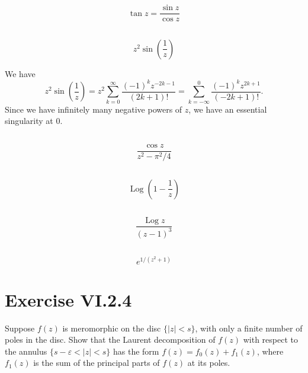 \documentclass[12pt]{article}
\newenvironment{problem}
    {\begin{lrbox}{\mybox}\begin{minipage}{0.98\textwidth}}
    {\end{minipage}\end{lrbox}\begin{center}\framebox[\textwidth]{\usebox{\mybox}}\end{center}}
\theoremstyle{definition}
\newcommand{\eps}{\varepsilon}
\newcommand{\Log}{\operatorname{Log}}
\begin{document}
\subsection{}
\begin{problem}
    \[
        \tan z = \frac{\sin z}{\cos z}
    \]
\end{problem}

\subsection{}
\begin{problem}
    \[
        z^2 \sin(\frac1z)
    \]
\end{problem}

We have
\[
    z^2 \sin(\frac1z)
        = z^2 \sum_{k=0}^\infty \frac{(-1)^k  z^{-2k - 1}}{(2k +1)!}
        = \sum_{k=-\infty}^0 \frac{(-1)^k  z^{2k + 1}}{(-2k +1)!}.
\]
Since we have infinitely many negative powers of $z$, we have an essential singularity at $0$.

\subsection{}
\begin{problem}
    \[
        \frac{\cos z}{z^2 - \pi^2/4}
    \]
\end{problem}

\subsection{}
\begin{problem}
    \[
        \Log\left(1 - \frac1z\right)
    \]
\end{problem}

\subsection{}
\begin{problem}
    \[
        \frac{\Log z}{(z - 1)^3}
    \]
\end{problem}

\subsection{}
\begin{problem}
    \[
        e^{1/(z^2 + 1)}
    \]
\end{problem}

\newpage
\section{Exercise VI.2.4}
\begin{problem}
    Suppose $f(z)$ is meromorphic on the disc $\{|z| < s\}$, with only a finite number of poles in the disc. Show that the Laurent decomposition of $f(z)$ with respect to the annulus $\{s - \eps < |z| < s\}$ has the form $f(z) = f_0(z) + f_1(z)$, where $f_1(z)$ is the sum of the principal parts of $f(z)$ at its poles.
\end{problem}
\end{document}
